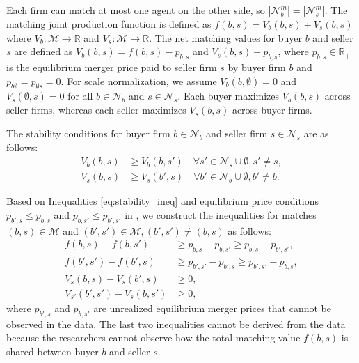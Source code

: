 \documentclass[10pt]{article}
\begin{document}
Each firm can match at most one agent on the other side, so  $|\mathcal{N}_b^{m}|=|\mathcal{N}_s^{m}|$. The matching joint production function is defined as $f(b,s)=V_b(b,s)+V_s(b,s)$ where $V_b:\mathcal{M}\rightarrow \mathbb{R}$ and $V_s:\mathcal{M}\rightarrow \mathbb{R}$. The net matching values for buyer $b$ and seller $s$ are defined as $V_b(b,s)=f(b,s)-p_{b,s}$ and $V_s(b,s)+p_{b,s}$, where $p_{b,s}\in \mathbb{R}_{+}$ is the equilibrium merger price paid to seller firm $s$ by buyer firm $b$ and $p_{b\emptyset}=p_{\emptyset s}=0$. For scale normalization, we assume $V_b(b,\emptyset)=0$ and $V_s(\emptyset,s)=0$ for all $b\in \mathcal{N}_b$ and $s\in \mathcal{N}_s$. Each buyer maximizes $V_b(b,s)$ across seller firms, whereas each seller maximizes $V_s(b,s)$ across buyer firms. 

The stability conditions for buyer firm $b \in \mathcal{N}_b$ and seller firm $s \in \mathcal{N}_s$ are as follows:
\begin{align}
    V_b(b,s) &\ge V_b(b,s') \quad \forall s' \in \mathcal{N}_s \cup \emptyset,s'\neq s,\label{eq:stability_ineq}\\
    V_s(b,s) &\ge V_s(b',s) \quad \forall b' \in \mathcal{N}_b\cup \emptyset,b'\neq b.\nonumber
\end{align}

Based on Inequalities \eqref{eq:stability_ineq} and equilibrium price conditions $p_{b',s}\le p_{b,s}$ and $p_{b,s'}\le p_{b',s'}$ in \cite{akkus2015ms}, we construct the inequalities for matches $(b,s)\in \mathcal{M}$ and $(b',s')\in \mathcal{M}, (b',s')\neq(b,s)$ as follows:
\begin{align}
    f(b,s)-f(b,s')&\ge p_{b,s}-p_{b,s'}\ge p_{b,s}-p_{b',s'},\label{eq:pairwise_stable_ineq}\\
    f(b',s')-f(b',s)&\ge p_{b',s'}-p_{b',s}\ge p_{b',s'}-p_{b,s},\nonumber\\
    V_s(b,s)-V_s(b',s)&\ge 0,\nonumber\\
    V_{s'}(b',s')-V_s(b,s')&\ge 0,\nonumber
\end{align}
where $p_{b',s}$ and $p_{b,s'}$ are unrealized equilibrium merger prices that cannot be observed in the data. The last two inequalities cannot be derived from the data because the researchers cannot observe how the total matching value $f(b,s)$ is shared between buyer $b$ and seller $s$.
\end{document}
